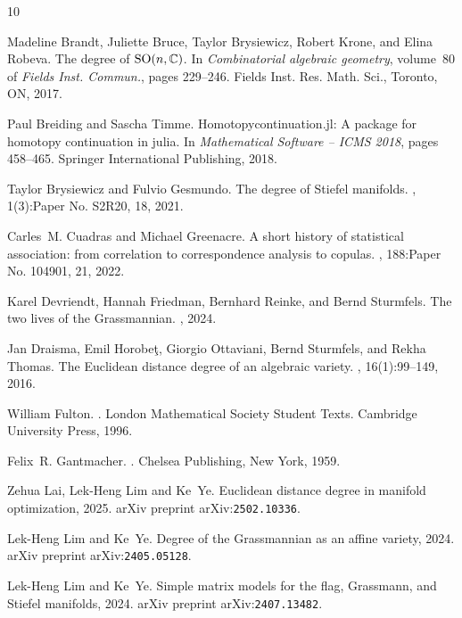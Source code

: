 \documentclass[12pt]{extarticle}
\theoremstyle{definition}
\numberwithin{theorem}{section}
\begin{document}
\begin{thebibliography}{10}

Madeline Brandt, Juliette Bruce, Taylor Brysiewicz, Robert Krone, and Elina Robeva.
\newblock The degree of {${\rm SO}(n,\mathbb C)$}.
\newblock In {\em Combinatorial algebraic geometry}, volume~80 of {\em Fields Inst. Commun.}, pages 229--246. Fields Inst. Res. Math. Sci., Toronto, ON, 2017.

Paul Breiding and Sascha Timme.
\newblock Homotopycontinuation.jl: A package for homotopy continuation in julia.
\newblock In {\em Mathematical Software -- ICMS 2018}, pages 458--465. Springer International Publishing, 2018.

Taylor Brysiewicz and Fulvio Gesmundo.
\newblock The degree of {S}tiefel manifolds.
, 1(3):Paper No. S2R20, 18, 2021.

Carles~M. Cuadras and Michael Greenacre.
\newblock A short history of statistical association: from correlation to correspondence analysis to copulas.
, 188:Paper No. 104901, 21, 2022.

Karel Devriendt, Hannah Friedman, Bernhard Reinke, and Bernd Sturmfels.
\newblock The two lives of the {G}rassmannian.
, 2024.

Jan Draisma, Emil Horobe\c{t}, Giorgio Ottaviani, Bernd Sturmfels, and Rekha Thomas. 
\newblock The {E}uclidean distance degree of an algebraic variety.
,  16(1):99--149, 2016.

William Fulton.
.
\newblock London Mathematical Society Student Texts. Cambridge University Press, 1996.

Felix~R. Gantmacher.
.
\newblock Chelsea Publishing, New York, 1959.

Zehua Lai, Lek-Heng Lim and Ke~Ye.
\newblock Euclidean distance degree in manifold optimization, 2025. 
\newblock arXiv preprint arXiv:\verb+2502.10336+.

Lek-Heng Lim and Ke~Ye.
\newblock Degree of the {G}rassmannian as an affine variety, 2024.
\newblock arXiv preprint arXiv:\verb+2405.05128+.

Lek-Heng Lim and Ke~Ye.
\newblock Simple matrix models for the flag, {G}rassmann, and {S}tiefel manifolds, 2024.
\newblock arXiv preprint arXiv:\verb+2407.13482+.


\end{thebibliography}
\end{document}
